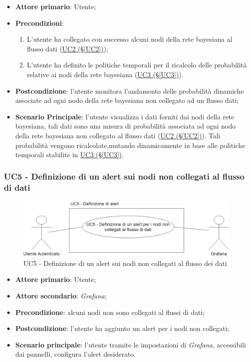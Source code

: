\begin{itemize}
\item \textbf{Attore primario}: Utente;
\item \textbf{Precondizioni}:
	\begin{enumerate}
	\item L'utente ha collegato con successo alcuni nodi della rete bayesiana al flusso dati (\hyperref[UC2]{UC2 (§\ref*{UC2})});
	\item L'utente ha definito le politiche temporali per il ricalcolo delle probabilità relative ai nodi della rete bayesiana (\hyperref[UC3]{UC3 (§\ref*{UC3})}).
	\end{enumerate}
\item \textbf{Postcondizione}: l'utente monitora l'andamento delle probabilità dinamiche associate ad ogni nodo della rete bayesiana non collegato ad un flusso dati;
\item \textbf{Scenario Principale}: l'utente visualizza i dati forniti dai nodi della rete bayesiana, tali dati sono una misura di probabilità associata ad ogni nodo della rete bayesiana non collegato al flusso dati (\hyperref[UC2]{UC2 (§\ref*{UC2})}). Tali probabilità vengono ricalcolate,mutando dinamicamente in base alle politiche temporali stabilite in \hyperref[UC3]{UC3 (§\ref*{UC3})}.
\end{itemize}

\pagebreak

\subsubsection{UC5 - Definizione di un alert sui nodi non collegati al flusso di dati}\label{UC5}

\begin{figure}[H]
	\centering
	\includegraphics[scale=0.4]{./images/UC5.png}
	\caption{UC5 - Definizione di un alert sui nodi non collegati al flusso dei dati}
\end{figure}

\begin{itemize}
	\item \textbf{Attore primario}: Utente;
	\item \textbf{Attore secondario}: \textit{Grafana};
	\item \textbf{Precondizione}: alcuni nodi non sono collegati al flussi di dati;
	\item \textbf{Postcondizione}: l'utente ha aggiunto un alert per i nodi non collegati;
	\item \textbf{Scenario principale}: l'utente tramite le impostazioni di \textit{Grafana}, accessibili dai pannelli, configura l'alert desiderato.
\end{itemize}

